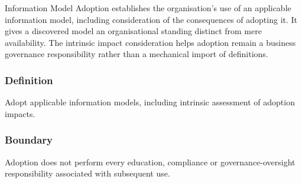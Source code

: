 Information Model Adoption establishes the organisation's use of an applicable information model, including consideration of the consequences of adopting it. It gives a discovered model an organisational standing distinct from mere availability. The intrinsic impact consideration helps adoption remain a business governance responsibility rather than a mechanical import of definitions.

\subsubsection*{Definition}

Adopt applicable information models, including intrinsic assessment of adoption impacts.

\subsubsection*{Boundary}

Adoption does not perform every education, compliance or governance-oversight responsibility associated with subsequent use.

